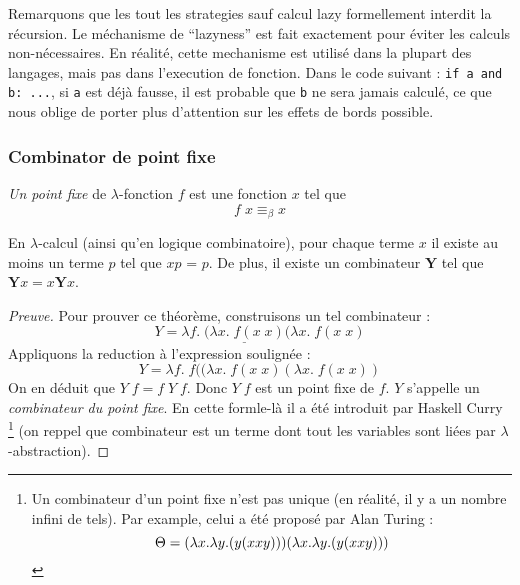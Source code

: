 Remarquons que les tout les strategies sauf calcul lazy formellement interdit la récursion.
Le méchanisme de ``lazyness'' est fait exactement pour éviter les calculs non-nécessaires.
En réalité, cette mechanisme est utilisé dans la plupart des langages, mais pas dans l'execution de fonction. Dans le code suivant : \verb|if a and b: ...|, si \verb|a| est déjà fausse, il est probable que \verb|b| ne sera jamais calculé, ce que nous oblige de porter plus d'attention sur les effets de bords possible.

\subsubsection*{Combinator de point fixe}
\begin{definition}
	\emph{Un point fixe} de $\lambda$-fonction $f$ est une fonction $x$ tel que $$f \; x \equiv_\beta x$$
\end{definition}
\begin{theorem}
	En $\lambda$-calcul (ainsi qu'en logique combinatoire), pour chaque terme $x$ il existe au moins un terme $p$ tel que $xp$ = $p$.
	De plus, il existe un combinateur $\mathbf{Y}$ tel que $\mathbf{Y} x = x \mathbf{Y} x$.
\end{theorem}
\begin{proof}[Preuve]
	Pour prouver ce théorème, construisons un tel combinateur :
	$$Y = \lambda f. \; \underline{(\lambda x. \; f(x \; x)} (\lambda x. \; f(x \; x)$$
	Appliquons la reduction à l'expression soulignée :
	$$Y = \lambda f. \; f ((\lambda x. \; f(x \; x) (\lambda x. \; f(x \; x))$$
	On en déduit que $Y \; f = f \; Y \; f$.
	Donc $Y \; f$ est un point fixe de $f$.
	$Y$ s'appelle un \emph{combinateur du point fixe}.
	En cette formle-là il a été introduit par Haskell Curry
	\footnote{
		Un combinateur d'un point fixe n'est pas unique (en réalité, il y a un nombre infini de tels).
		Par example, celui a été proposé par Alan Turing : $$\Theta = (\lambda x.\lambda y.(y(xxy)))(\lambda x.\lambda y.(y(xxy)))$$
	}
	(on reppel que combinateur est un terme dont tout les variables sont liées par $\lambda$-abstraction).
\end{proof}

